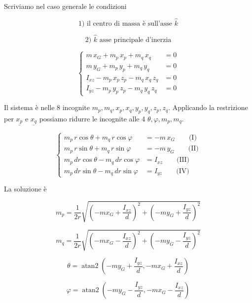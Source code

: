 Scriviamo nel caso generale le condizioni

\[
\text{1) il centro di massa è sull'asse } \hat{k}
\]

\[
\text{2) } \hat{k} \text{ asse principale d'inerzia}
\]

\[
\left\{
\begin{aligned}
m\,x_G + m_p\,x_p + m_q\,x_q &= 0\\
m\,y_G + m_p\,y_p + m_q\,y_q &= 0\\
I_{xz} - m_p\,x_p\,z_p - m_q\,x_q\,z_q &= 0\\
I_{yz} - m_p\,y_p\,z_p - m_q\,y_q\,z_q &= 0
\end{aligned}
\right.
\]

Il sistema è nelle 8 incognite \(m_p,m_q,x_p,x_q,y_p,y_q,z_p,z_q\).
Applicando la restrizione per \(\underline{x_p}\) e \(\underline{x_q}\) possiamo ridurre le incognite alle 4 \(\theta,\varphi,m_p,m_q\).

\[
\left\{
\begin{aligned}
m_p\,r\cos\theta + m_q\,r\cos\varphi &= -m\,x_G \qquad \text{(I)}\\
m_p\,r\sin\theta + m_q\,r\sin\varphi &= -m\,y_G \qquad \text{(II)}\\
m_p\,d r\cos\theta - m_q\,d r\cos\varphi &= I_{xz} \qquad \text{(III)}\\
m_p\,d r\sin\theta - m_q\,d r\sin\varphi &= I_{yz} \qquad \text{(IV)}
\end{aligned}
\right.
\]

La soluzione è

\[
m_p=\frac{1}{2r}\sqrt{\left(-m x_G+\frac{I_{xz}}{d}\right)^2+\left(-m y_G+\frac{I_{yz}}{d}\right)^2}
\]

\[
m_q=\frac{1}{2r}\sqrt{\left(-m x_G-\frac{I_{xz}}{d}\right)^2+\left(-m y_G-\frac{I_{yz}}{d}\right)^2}
\]

\[
\theta=\operatorname{atan2}\left(-m y_G+\frac{I_{yz}}{d},-m x_G+\frac{I_{xz}}{d}\right)
\]

\[
\varphi=\operatorname{atan2}\left(-m y_G-\frac{I_{yz}}{d},-m x_G-\frac{I_{xz}}{d}\right)
\]
